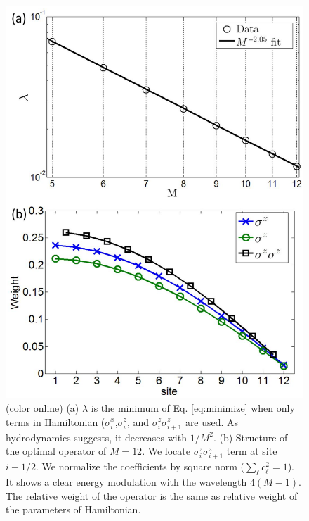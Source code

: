 \documentclass[twocolumn,superscriptaddress, prb]{revtex4-1}
\begin{document}
\begin{figure}
\includegraphics[width=1.00\linewidth]{Hamiltonian_only.pdf}
\centering
\caption{(color online) (a) $\lambda$ is the minimum of Eq. \eqref{eq:minimize} when only terms in Hamiltonian ($\sigma^x_i$,$\sigma^z_i$, and $\sigma^z_i\sigma^z_{i+1}$ are used. As hydrodynamics suggests, it decreases with $1/M^2$. (b) Structure of the optimal operator of $M = 12$.
We locate $\sigma^z_i \sigma^z_{i+1}$ term at site $i+1/2$. We normalize the coefficients by square norm ($\sum_\ell c_\ell^2 = 1$).
It shows a clear energy modulation with the wavelength $4(M-1)$. The relative weight of the operator is the same as relative weight of the parameters of Hamiltonian. }
\label{fig:ham_only}
\end{figure}
\end{document}
